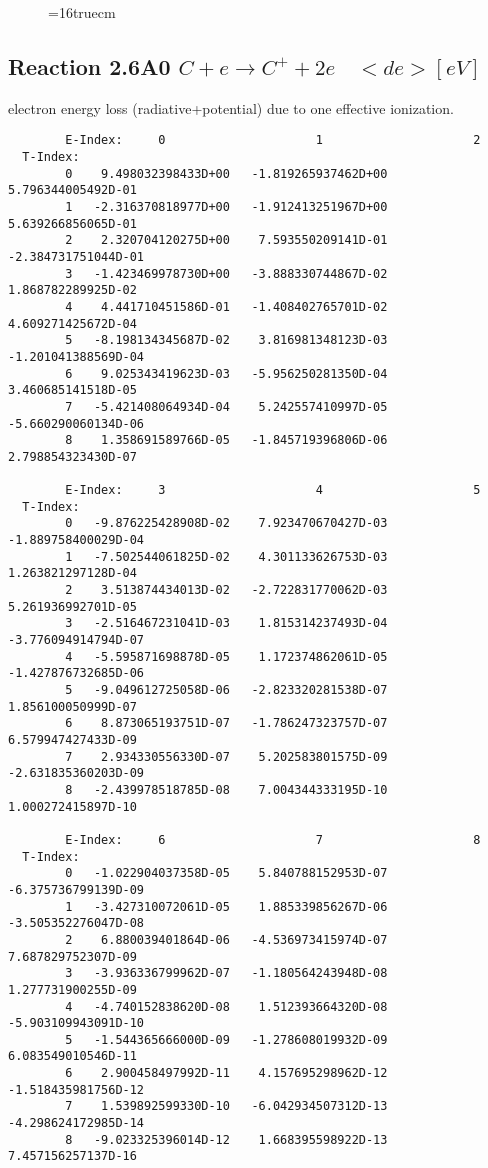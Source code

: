 \documentclass[12pt,dvipdfmx]{article}
\begin{document}
{\begin{small}
\begin{verbatim}
\end{verbatim}\end{small}
\begin{figure} \label{2.3.13aec}
\epsfxsize=16truecm
\end{figure}
\newpage


\subsection{
  Reaction 2.6A0 $C  + e \rightarrow C^+   + 2e $ \ $<de> [eV] $
}

  electron energy loss (radiative+potential) due to one effective ionization.

\begin{small}\begin{verbatim}
        E-Index:     0                     1                     2
  T-Index:
        0    9.498032398433D+00   -1.819265937462D+00    5.796344005492D-01
        1   -2.316370818977D+00   -1.912413251967D+00    5.639266856065D-01
        2    2.320704120275D+00    7.593550209141D-01   -2.384731751044D-01
        3   -1.423469978730D+00   -3.888330744867D-02    1.868782289925D-02
        4    4.441710451586D-01   -1.408402765701D-02    4.609271425672D-04
        5   -8.198134345687D-02    3.816981348123D-03   -1.201041388569D-04
        6    9.025343419623D-03   -5.956250281350D-04    3.460685141518D-05
        7   -5.421408064934D-04    5.242557410997D-05   -5.660290060134D-06
        8    1.358691589766D-05   -1.845719396806D-06    2.798854323430D-07

        E-Index:     3                     4                     5
  T-Index:
        0   -9.876225428908D-02    7.923470670427D-03   -1.889758400029D-04
        1   -7.502544061825D-02    4.301133626753D-03    1.263821297128D-04
        2    3.513874434013D-02   -2.722831770062D-03    5.261936992701D-05
        3   -2.516467231041D-03    1.815314237493D-04   -3.776094914794D-07
        4   -5.595871698878D-05    1.172374862061D-05   -1.427876732685D-06
        5   -9.049612725058D-06   -2.823320281538D-07    1.856100050999D-07
        6    8.873065193751D-07   -1.786247323757D-07    6.579947427433D-09
        7    2.934330556330D-07    5.202583801575D-09   -2.631835360203D-09
        8   -2.439978518785D-08    7.004344333195D-10    1.000272415897D-10

        E-Index:     6                     7                     8
  T-Index:
        0   -1.022904037358D-05    5.840788152953D-07   -6.375736799139D-09
        1   -3.427310072061D-05    1.885339856267D-06   -3.505352276047D-08
        2    6.880039401864D-06   -4.536973415974D-07    7.687829752307D-09
        3   -3.936336799962D-07   -1.180564243948D-08    1.277731900255D-09
        4   -4.740152838620D-08    1.512393664320D-08   -5.903109943091D-10
        5   -1.544365666000D-09   -1.278608019932D-09    6.083549010546D-11
        6    2.900458497992D-11    4.157695298962D-12   -1.518435981756D-12
        7    1.539892599330D-10   -6.042934507312D-13   -4.298624172985D-14
        8   -9.023325396014D-12    1.668395598922D-13    7.457156257137D-16


\end{verbatim}
\end{small}}
\end{document}
